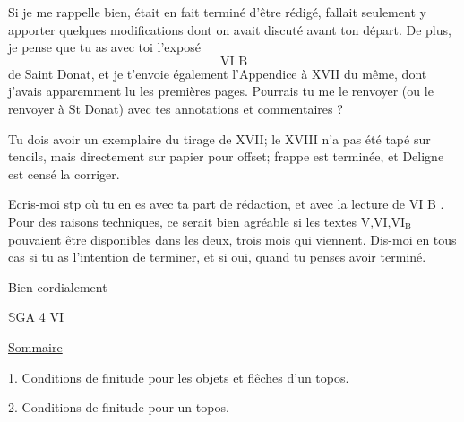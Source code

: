 Si je me rappelle bien,  était en fait terminé d'être rédigé,  fallait seulement y apporter quelques modifications dont on avait discuté avant ton départ. De plus, je pense que tu as avec toi l'exposé
\[
\text{VI B}
\]
de Saint Donat, et je t'envoie également l'Appendice à XVII du même, dont j'avais apparemment lu les premières pages. P\(\mathbb{o}\)urrais tu me le renvoyer (ou le renvoyer à St Donat) avec tes annotations et commentaires ?

Tu dois avoir un exemplaire du tirage de XVII; le XVIII n'a pas été tapé sur tencils, mais directement sur papier pour offset;  frappe est terminée, et Deligne est censé la corriger.

Ecris-moi stp où tu en es avec ta part de rédaction, et avec la lecture de VI B .  Pour des raisons techniques, ce serait bien agréable si les textes V,VI,\(\mathrm{VI}_{\mathrm{B}}\) pouvaient être disponibles dans les deux, trois mois qui viennent. Dis-moi en tous cas si tu as l'intention de terminer, et si oui, quand tu penses avoir terminé.

Bien cordialement\\

\begin{flushright}\end{flushright}

\(\mathbb{S}\)GA 4 VI

\uline{Sommaire}

1. Conditions de finitude pour les objets et flêches d'un topos.

2. Conditions de finitude pour un topos.

